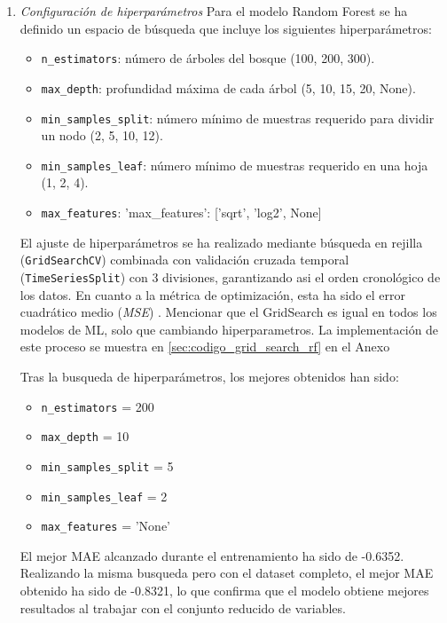 \begin{enumerate}
    \item \emph{Configuración de hiperparámetros}
    Para el modelo Random Forest se ha definido un espacio de búsqueda que incluye los siguientes hiperparámetros:

    \begin{itemize}
        \item \texttt{n\_estimators}: número de árboles del bosque (100, 200, 300).
        \item \texttt{max\_depth}: profundidad máxima de cada árbol (5, 10, 15, 20, None).
        \item \texttt{min\_samples\_split}: número mínimo de muestras requerido para dividir un nodo (2, 5, 10, 12).
        \item \texttt{min\_samples\_leaf}: número mínimo de muestras requerido en una hoja (1, 2, 4).
        \item \texttt{max\_features}: 'max\_features': ['sqrt', 'log2', None]
    \end{itemize}

    El ajuste de hiperparámetros se ha realizado mediante búsqueda en rejilla (\texttt{GridSearchCV}) \cite{scikit_grid} combinada con validación cruzada temporal \newline (\texttt{TimeSeriesSplit}) \cite{scikit_ts} con 3 divisiones, garantizando asi el orden cronológico de los datos. En cuanto a la métrica de optimización, esta ha sido el error cuadrático medio (\textit{MSE}) \cite{mse}. Mencionar que el GridSearch es igual en todos los modelos de ML, solo que cambiando hiperparametros. La implementación de este proceso se muestra en \ref{sec:codigo_grid_search_rf} en el Anexo

    Tras la busqueda de hiperparámetros, los mejores obtenidos han sido:

    \begin{itemize}
        \item \texttt{n\_estimators} = 200
        \item \texttt{max\_depth} = 10
        \item \texttt{min\_samples\_split} = 5
        \item \texttt{min\_samples\_leaf} = 2
        \item \texttt{max\_features} = 'None'
    \end{itemize}

    El mejor MAE alcanzado durante el entrenamiento ha sido de -0.6352. Realizando la misma busqueda pero con el dataset completo, el mejor MAE obtenido ha sido de -0.8321, lo que confirma que el modelo obtiene mejores resultados al trabajar con el conjunto reducido de variables.


\end{enumerate}
